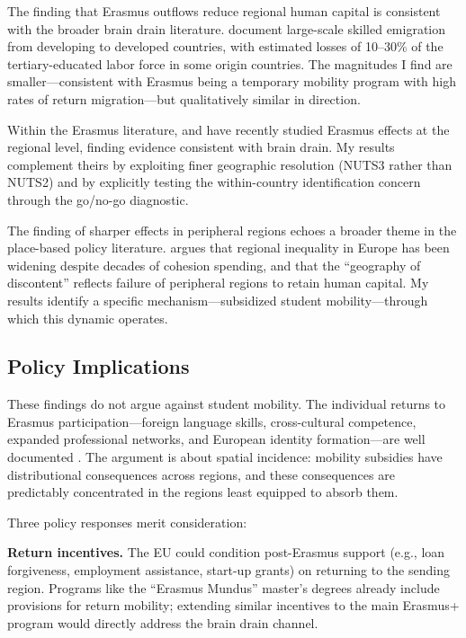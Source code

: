 \documentclass[12pt]{article}
\begin{document}
The finding that Erasmus outflows reduce regional human capital is consistent with the broader brain drain literature. \citet{docquier_rapoport_2012} document large-scale skilled emigration from developing to developed countries, with estimated losses of 10--30\% of the tertiary-educated labor force in some origin countries. The magnitudes I find are smaller---consistent with Erasmus being a temporary mobility program with high rates of return migration---but qualitatively similar in direction.

Within the Erasmus literature, \citet{sorrenti_2025} and \citet{de_benedetto_etal_2025} have recently studied Erasmus effects at the regional level, finding evidence consistent with brain drain. My results complement theirs by exploiting finer geographic resolution (NUTS3 rather than NUTS2) and by explicitly testing the within-country identification concern through the go/no-go diagnostic.

The finding of sharper effects in peripheral regions echoes a broader theme in the place-based policy literature. \citet{rodriguez_pose_2018} argues that regional inequality in Europe has been widening despite decades of cohesion spending, and that the ``geography of discontent'' reflects failure of peripheral regions to retain human capital. My results identify a specific mechanism---subsidized student mobility---through which this dynamic operates.

\subsection{Policy Implications}

These findings do not argue against student mobility. The individual returns to Erasmus participation---foreign language skills, cross-cultural competence, expanded professional networks, and European identity formation---are well documented \citep{parey_waldinger_2011, di_pietro_2019, cattaneo_wolter_2018}. The argument is about spatial incidence: mobility subsidies have distributional consequences across regions, and these consequences are predictably concentrated in the regions least equipped to absorb them.

Three policy responses merit consideration:

\textbf{Return incentives.} The EU could condition post-Erasmus support (e.g., loan forgiveness, employment assistance, start-up grants) on returning to the sending region. Programs like the ``Erasmus Mundus'' master's degrees already include provisions for return mobility; extending similar incentives to the main Erasmus+ program would directly address the brain drain channel.
\end{document}
